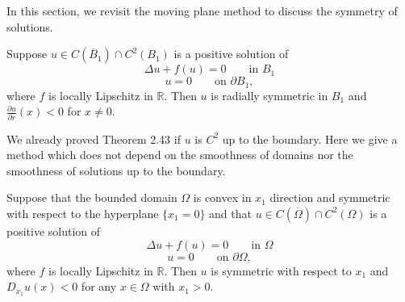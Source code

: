 In this section, we revisit the moving plane method to discuss the symmetry of solutions.

\begin{theorem}\label{hanlin:maxprin-theorem-2-43}
Suppose $u \in C(\overline{B}_1) \cap C^2(B_1)$ is a positive solution of
\[
\Delta u + f(u) = 0 \qquad \text{in } B_1
\]
\[
u = 0 \qquad \text{on } \partial B_1,
\]
where $f$ is locally Lipschitz in $\mathbb{R}$. Then $u$ is radially symmetric in $B_1$ and $\frac{\partial u}{\partial r}(x) < 0$ for $x \ne 0$.
\end{theorem}

We already proved Theorem 2.43 if $u$ is $C^2$ up to the boundary. Here we give a method which does not depend on the smoothness of domains nor the smoothness of solutions up to the boundary.

\begin{lemma}\label{hanlin:maxprin-lemma-2-44}
Suppose that the bounded domain $\Omega$ is convex in $x_1$ direction and symmetric with respect to the hyperplane $\{x_1 = 0\}$ and that $u \in C(\overline{\Omega}) \cap C^2(\Omega)$ is a positive solution of
\[
\Delta u + f(u) = 0 \qquad \text{in } \Omega
\]
\[
u = 0 \qquad \text{on } \partial \Omega,
\]
where $f$ is locally Lipschitz in $\mathbb{R}$. Then $u$ is symmetric with respect to $x_1$ and $D_{x_1}u(x) < 0$ for any $x \in \Omega$ with $x_1 > 0$.
\end{lemma}

